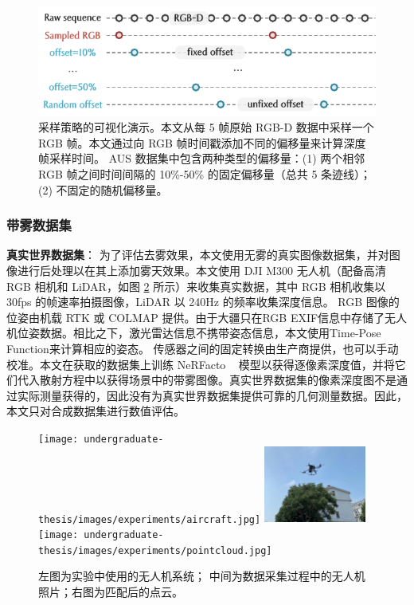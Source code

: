 \begin{figure}[ht]
    \centering
    \includegraphics[width=\textwidth]{undergraduate-thesis/images/experiments/offset.pdf}
    \caption{采样策略的可视化演示。本文从每 5 帧原始 RGB-D 数据中采样一个 RGB 帧。本文通过向 RGB 帧时间戳添加不同的偏移量来计算深度帧采样时间。 AUS 数据集中包含两种类型的偏移量：(1) 两个相邻 RGB 帧之间时间间隔的 10\%-50\% 的固定偏移量（总共 5 条迹线）； (2) 不固定的随机偏移量。}
    \label{fig:exp-aus-offset}
\end{figure}

\subsubsection{带雾数据集}
\textbf{真实世界数据集}：
为了评估去雾效果，本文使用无雾的真实图像数据集，并对图像进行后处理以在其上添加雾天效果。本文使用 DJI M300 无人机（配备高清 RGB 相机和 LiDAR，如图 \ref{fig:real-world-setting} 所示）来收集真实数据，其中 RGB 相机收集以 30fps 的帧速率拍摄图像，LiDAR 以 240Hz 的频率收集深度信息。 RGB 图像的位姿由机载 RTK 或 COLMAP 提供。由于大疆只在RGB EXIF信息中存储了无人机位姿数据。相比之下，激光雷达信息不携带姿态信息，本文使用Time-Pose Function来计算相应的姿态。
传感器之间的固定转换由生产商提供，也可以手动校准。本文在获取的数据集上训练 NeRFacto ~\cite{tancik_nerfstudio_2023} 模型以获得逐像素深度值，并将它们代入散射方程中以获得场景中的带雾图像。真实世界数据集的像素深度图不是通过实际测量获得的，因此没有为真实世界数据集提供可靠的几何测量数据。因此，本文只对合成数据集进行数值评估。

\begin{figure}[ht]
	\begin{center}
	\texttt{[image: undergraduate-thesis/images/experiments/aircraft.jpg]}
	\includegraphics[width=0.3\textwidth]{undergraduate-thesis/images/experiments/flight-near.jpg}
	\texttt{[image: undergraduate-thesis/images/experiments/pointcloud.jpg]}
	\end{center}
	\caption{左图为实验中使用的无人机系统； 中间为数据采集过程中的无人机照片；右图为匹配后的点云。}
	\label{fig:real-world-setting}
\end{figure}

